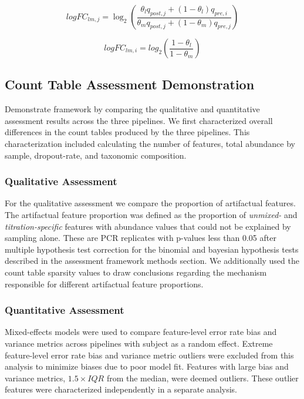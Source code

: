 \documentclass{bmcart}
\begin{document}
\begin{equation}
      logFC_{lm,j} = \log_2\left(\frac{\theta_l q_{post,j} + (1 - \theta_l) q_{pre,i}}{\theta_m q_{post,j} + (1 - \theta_m) q_{pre,j}}\right)
  \label{eq:expLogFC}
\end{equation}

\begin{equation}
      logFC_{lm,i} = log_2\left(\frac{1-\theta_l}{1-\theta_m}\right)
  \label{eq:expPreLogFC}
\end{equation}


\subsection*{Count Table Assessment Demonstration}
Demonstrate framework by comparing the qualitative and quantitative assessment results across the three pipelines.
We first characterized overall differences in the count tables produced by the three pipelines.
This characterization included calculating the number of features, total abundance by sample, dropout-rate, and taxonomic composition.

\subsubsection*{Qualitative Assessment}
For the qualitative assessment we compare the proportion of artifactual features.
The artifactual feature proportion was defined as the proportion of \emph{unmixed-} and \emph{titration-specific} features with abundance values that could not be explained by sampling alone.
These are PCR replicates with p-values less than 0.05 after multiple hypothesis test correction for the binomial and bayesian hypothesis tests described in the assessment framework methods section.
We additionally used the count table sparsity values to draw conclusions regarding the mechanism responsible for different artifactual feature proportions.

\subsubsection*{Quantitative Assessment}
Mixed-effects models were used to compare feature-level
error rate bias and variance metrics across pipelines with subject as a
random effect. Extreme feature-level error rate bias and variance metric
outliers were excluded from this analysis to minimize biases due to poor model fit. 
Features with large bias and variance metrics, \(1.5\times IQR\) from the median, were deemed outliers. 
These outlier features were characterized independently in a separate analysis. 
\end{document}
